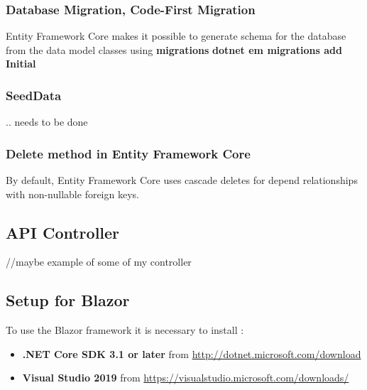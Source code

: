 \documentclass{scrartcl}
\begin{document}
\cite{core3}
\subsubsection{Database Migration, Code-First Migration}
Entity Framework Core makes it possible to generate schema for the database from the data model classes using \textbf{migrations}
\textbf{dotnet em migrations add Initial} 
\cite{core3}

\subsubsection{SeedData}
.. needs to be done

\subsubsection{Delete method in Entity Framework Core}
By default, Entity Framework Core uses cascade deletes for depend relationships with non-nullable foreign keys. \cite{efa}

\subsection{API Controller}

//maybe example of some of my controller









\subsection{Setup for Blazor}
To use the Blazor framework it is necessary to install :\\
\begin{itemize}
\item \textbf{.NET Core SDK 3.1 or later} from \url {http://dotnet.microsoft.com/download}
\item \textbf{Visual Studio 2019} from \url {https://visualstudio.microsoft.com/downloads/}
\end{itemize}

\end{document}
